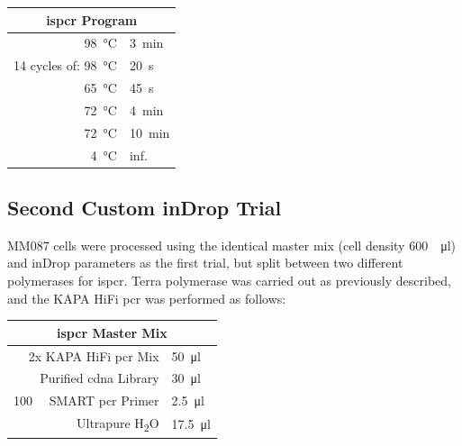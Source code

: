 \begin{appendix}
\begin{multicols}{2}
\begin{center}
\begin{tabular}{r|l}
	\multicolumn{2}{c}{\acrshort{ispcr} Program} \\
	\hline
	\SI{98}{\celsius} & \SI{3}{\minute} \\
	\hline
	14 cycles of: \SI{98}{\celsius} & \SI{20}{\second} \\
	\SI{65}{\celsius} & \SI{45}{\second} \\
	\SI{72}{\celsius} & \SI{4}{\minute} \\
	\hline
	\SI{72}{\celsius} & \SI{10}{\minute} \\
	\SI{4}{\celsius} & inf. \\
\end{tabular}
\end{center}
\medskip

\subsection{Second Custom inDrop Trial}
\label{app:meth_second_indrop_trial}
MM087 cells were processed using the identical master mix (cell density \SI{600}{\per\ul}) and inDrop parameters as the first trial, but split between two different polymerases for \acrshort{ispcr}. Terra polymerase was carried out as previously described, and the KAPA HiFi \acrshort{pcr} was performed as follows:\pms

\begin{center}
\begin{tabular}{r|l}
	\multicolumn{2}{c}{\acrshort{ispcr} Master Mix} \\
	\hline
	2x KAPA HiFi \acrshort{pcr} Mix & \SI{50}{\ul} \\
	Purified \acrshort{cdna} Library & \SI{30}{\ul} \\
	\SI{100}{\micro\molar} SMART \acrshort{pcr} Primer & \SI{2.5}{\ul} \\
	Ultrapure H\textsubscript{2}O & \SI{17.5}{\ul} \\
\end{tabular}
\end{center}
\medskip


\end{multicols}
\end{appendix}
